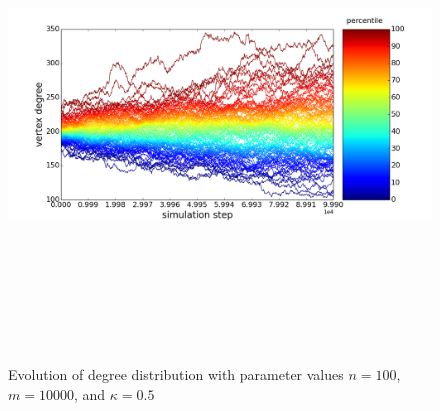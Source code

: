 \documentclass[11pt]{article}
\begin{document}
\begin{figure}[h!]
  \centering
  \includegraphics[height=130mm]{n_100_short}
  \caption{Evolution of degree distribution with parameter values $n=100$, $m=10000$, and $\kappa=0.5$}
  \label{fig:100sv}
\end{figure}
\end{document}
